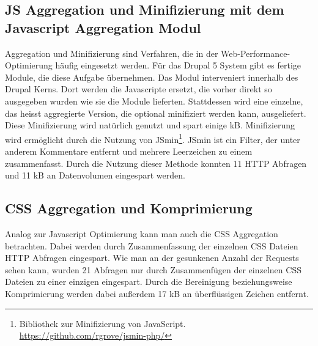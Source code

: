 \subsection{JS Aggregation und Minifizierung mit dem Javascript Aggregation Modul}
Aggregation und Minifizierung sind Verfahren, die in der Web-Performance-Optimierung häufig eingesetzt werden. Für das Drupal 5 System gibt es fertige Module, die diese Aufgabe übernehmen. Das Modul interveniert innerhalb des Drupal Kerns. Dort werden die Javascripte ersetzt, die vorher direkt so ausgegeben wurden wie sie die Module lieferten. Stattdessen wird eine einzelne, das heisst aggregierte Version, die optional minifiziert werden kann, ausgeliefert. Diese Minifizierung wird natürlich genutzt und spart einige kB. Minifizierung wird ermöglicht durch die Nutzung von JSmin\footnote{Bibliothek zur Minifizierung von JavaScript. \url{https://github.com/rgrove/jsmin-php/}}. JSmin ist ein Filter, der unter anderem Kommentare entfernt und mehrere Leerzeichen zu einem zusammenfasst. Durch die Nutzung dieser Methode konnten 11 HTTP Abfragen und 11 kB an Datenvolumen eingespart werden.

\subsection{CSS Aggregation und Komprimierung}
Analog zur Javascript Optimierung kann man auch die CSS Aggregation betrachten. Dabei werden durch Zusammenfassung der einzelnen CSS Dateien HTTP Abfragen eingespart. Wie man an der gesunkenen Anzahl der Requests sehen kann, wurden 21 Abfragen nur durch Zusammenfügen der einzelnen CSS Dateien zu einer einzigen eingespart. Durch die Bereinigung beziehungsweise Komprimierung werden dabei außerdem 17 kB an überflüssigen Zeichen entfernt. 
